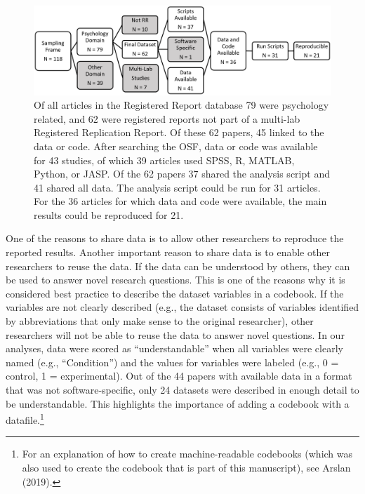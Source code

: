 \documentclass[
  ,jou, a4paper,floatsintext]{apa6}
\begin{document}
\begin{figure}
\begin{center}
\includegraphics[width=\textwidth]{fig1.png}

\caption{Of all articles in the Registered Report database 79 were psychology related, and 62 were registered reports not part of a multi-lab Registered Replication Report. Of these 62 papers, 45 linked to the data or code. After searching the OSF, data or code was available for 43 studies, of which 39 articles used SPSS, R, MATLAB, Python, or JASP. Of the 62 papers 37 shared the analysis script and 41 shared all data. The analysis script could be run for 31 articles. For the 36 articles for which data and code were available, the main results could be reproduced for 21. 
}

\label{fig:fig1}
\end{center}
\end{figure}

One of the reasons to share data is to allow other researchers to reproduce the reported results. Another important reason to share data is to enable other researchers to reuse the data. If the data can be understood by others, they can be used to answer novel research questions. This is one of the reasons why it is considered best practice to describe the dataset variables in a codebook. If the variables are not clearly described (e.g., the dataset consists of variables identified by abbreviations that only make sense to the original researcher), other researchers will not be able to reuse the data to answer novel questions. In our analyses, data were scored as \enquote{understandable} when all variables were clearly named (e.g., \enquote{Condition}) and the values for variables were labeled (e.g., 0 = control, 1 = experimental). Out of the 44 papers with available data in a format that was not software-specific, only 24 datasets were described in enough detail to be understandable. This highlights the importance of adding a codebook with a datafile.\footnote{For an explanation of how to create machine-readable codebooks (which was also used to create the codebook that is part of this manuscript), see Arslan (2019).}
\end{document}

